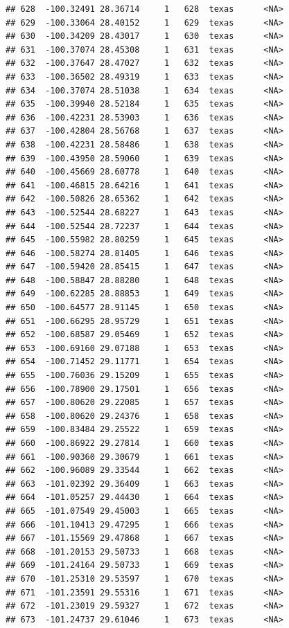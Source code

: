 \documentclass[
]{article}
\begin{document}
\begin{verbatim}
## 628  -100.32491 28.36714     1   628  texas      <NA>
## 629  -100.33064 28.40152     1   629  texas      <NA>
## 630  -100.34209 28.43017     1   630  texas      <NA>
## 631  -100.37074 28.45308     1   631  texas      <NA>
## 632  -100.37647 28.47027     1   632  texas      <NA>
## 633  -100.36502 28.49319     1   633  texas      <NA>
## 634  -100.37074 28.51038     1   634  texas      <NA>
## 635  -100.39940 28.52184     1   635  texas      <NA>
## 636  -100.42231 28.53903     1   636  texas      <NA>
## 637  -100.42804 28.56768     1   637  texas      <NA>
## 638  -100.42231 28.58486     1   638  texas      <NA>
## 639  -100.43950 28.59060     1   639  texas      <NA>
## 640  -100.45669 28.60778     1   640  texas      <NA>
## 641  -100.46815 28.64216     1   641  texas      <NA>
## 642  -100.50826 28.65362     1   642  texas      <NA>
## 643  -100.52544 28.68227     1   643  texas      <NA>
## 644  -100.52544 28.72237     1   644  texas      <NA>
## 645  -100.55982 28.80259     1   645  texas      <NA>
## 646  -100.58274 28.81405     1   646  texas      <NA>
## 647  -100.59420 28.85415     1   647  texas      <NA>
## 648  -100.58847 28.88280     1   648  texas      <NA>
## 649  -100.62285 28.88853     1   649  texas      <NA>
## 650  -100.64577 28.91145     1   650  texas      <NA>
## 651  -100.66295 28.95729     1   651  texas      <NA>
## 652  -100.68587 29.05469     1   652  texas      <NA>
## 653  -100.69160 29.07188     1   653  texas      <NA>
## 654  -100.71452 29.11771     1   654  texas      <NA>
## 655  -100.76036 29.15209     1   655  texas      <NA>
## 656  -100.78900 29.17501     1   656  texas      <NA>
## 657  -100.80620 29.22085     1   657  texas      <NA>
## 658  -100.80620 29.24376     1   658  texas      <NA>
## 659  -100.83484 29.25522     1   659  texas      <NA>
## 660  -100.86922 29.27814     1   660  texas      <NA>
## 661  -100.90360 29.30679     1   661  texas      <NA>
## 662  -100.96089 29.33544     1   662  texas      <NA>
## 663  -101.02392 29.36409     1   663  texas      <NA>
## 664  -101.05257 29.44430     1   664  texas      <NA>
## 665  -101.07549 29.45003     1   665  texas      <NA>
## 666  -101.10413 29.47295     1   666  texas      <NA>
## 667  -101.15569 29.47868     1   667  texas      <NA>
## 668  -101.20153 29.50733     1   668  texas      <NA>
## 669  -101.24164 29.50733     1   669  texas      <NA>
## 670  -101.25310 29.53597     1   670  texas      <NA>
## 671  -101.23591 29.55316     1   671  texas      <NA>
## 672  -101.23019 29.59327     1   672  texas      <NA>
## 673  -101.24737 29.61046     1   673  texas      <NA>

\end{verbatim}
\end{document}
